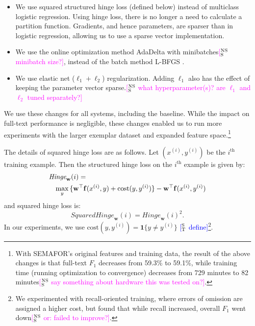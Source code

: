 \documentclass[11pt,a4paper]{article}
\newcommand{\indicator}[1]{\boldsymbol{1}\{#1\}}
\newcommand{\ensuretext}[1]{#1}
\newcommand{\nssmarker}{\ensuretext{\textcolor{magenta}{\ensuremath{^{\textsc{NS}}_{\textsc{S}}}}}}
\newcommand{\mkmarker}{\ensuretext{\textcolor{mdgreen}{\ensuremath{^{\textsc{M}}_{\textsc{K}}}}}}
\newcommand{\stmarker}{\ensuretext{\textcolor{blue}{\ensuremath{^{\textsc{S}}_{\textsc{T}}}}}}
\newcommand{\arkcomment}[3]{\ensuretext{\textcolor{#3}{[#1 #2]}}}
\newcommand{\nss}[1]{\arkcomment{\nssmarker}{#1}{magenta}}
\newcommand{\mk}[1]{\arkcomment{\mkmarker}{#1}{mdgreen}}
\newcommand{\st}[1]{\arkcomment{\stmarker}{#1}{blue}}
\begin{document}
\begin{itemize}
  \item We use squared structured hinge loss (defined below) instead of multiclass logistic regression.
  Using hinge loss, there is no longer a need to calculate a partition function.
  Gradients, and hence parameters, are sparser than in logistic regression, allowing us to use a sparse vector implementation.
  \item We use the online optimization method AdaDelta \citep{zeiler-12} with minibatches\nss{minibatch size?}, instead of the batch method L-BFGS \citep{liu-89}.
  \item We use elastic net ($\ell_1 + \ell_2$) regularization. Adding $\ell_1$ also has the effect of keeping the parameter vector sparse.\nss{what hyperparameter(s)? are $\ell_1$ and $\ell_2$ tuned separately?}
\end{itemize}
We use these changes for all systems, including the baseline.
While the impact on full-text performance is negligible, 
these changes enabled us to run more experiments with the larger exemplar dataset and expanded feature space.\footnote{With SEMAFOR's original features and training data, 
the result of the above changes is that full-text $F_1$ decreases from 59.3\% to 59.1\%, 
while training time (running optimization to convergence) 
decreases from 729 minutes to 82 minutes\nss{say something about hardware this was tested on?}.%
} 


The details of squared hinge loss are as follows.
Let $(x^{(i)}, y^{(i)})$ be the $i^{\text{th}}$ training example.
Then the structured hinge loss on the $i^{\text{th}}$ example is given by:
\begin{align*}
\lefteqn{\textit{Hinge}_\mathbf{w}(i) =} \\
&&\max_y{\{\mathbf{w}^\top \mathbf{f}(x^{(i)}, y) + \text{cost}(y, y^{(i)})\}} - \mathbf{w}^\top \mathbf{f}(x^{(i)}, y^{(i)})
\end{align*}
and squared hinge loss is:
\begin{equation}
\textit{SquaredHinge}_\mathbf{w}(i) =
\textit{Hinge}_\mathbf{w}(i)^2.
\end{equation}
In our experiments, we use $\text{cost}(y, y^{(i)}) = \indicator{y \ne y^{(i)}}$ \st{define}\footnote{We experimented with recall-oriented training, where errors of omission are assigned a higher cost, but found that while recall increased, overall $F_1$ went down\nss{or: failed to improve?}.}.
\end{document}

